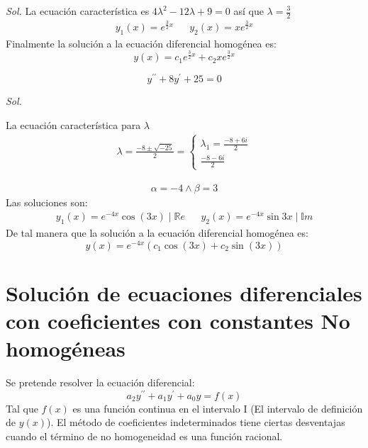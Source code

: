 \textit{ Sol. }
La ecuación característica es $4\lambda^2-12\lambda+9=0$ así que $\lambda= \frac{3}{2}$
\begin{align*}
    y_1(x) = e^{\frac{3}{2}x}&& y_2(x) = xe^{\frac{3}{2}x}
\end{align*}
Finalmente la solución a la ecuación diferencial homogénea es:
\begin{equation*}
    y(x) = c_1e^{\frac{3}{2}x}+ c_2xe^{\frac{3}{2}x}
\end{equation*}

\begin{example}
    \begin{equation*}
        y^{\prime\prime} + 8y^{\prime} + 25 =0
    \end{equation*}
\end{example}

\textit{ Sol. }

La ecuación característica para $\lambda$
\begin{align*}
    \lambda = \frac{ - 8\pm \sqrt{ -25}}{2} = \begin{cases} \lambda_1 = \frac{- 8 + 6i}{2}\\\frac{- 8 - 6i}{2}
     \end{cases} 
\end{align*}

\begin{align*}
    \alpha =- 4\land \beta = 3
\end{align*}
Las soluciones son:
\begin{align*}
    y_1(x) = e^{- 4x} \cos{(3x)}\mid \mathbb{R}e && y_2(x) = e^{ - 4x}\sin{3x} \mid \mathbb{I}m
\end{align*}
De tal manera que la solución a la ecuación diferencial homogénea es:
\begin{equation*}
    y(x) = e^{ - 4x}\left(c_1\cos{(3x)} +c_2\sin{(3x)} \right)
\end{equation*}
\section{Solución de ecuaciones diferenciales con coeficientes con constantes No homogéneas}

Se pretende resolver la ecuación diferencial:
\begin{equation}
    a_2 y^{\prime\prime} + a_1y^{\prime} + a_0y = f(x)
    \label{eq:ecuaciondiferencial1}
\end{equation}
Tal que $f(x)$ es una función continua en el intervalo I (El intervalo de definición de $y(x)$). El método de coeficientes indeterminados tiene ciertas desventajas cuando el término de no homogeneidad es una función racional.

